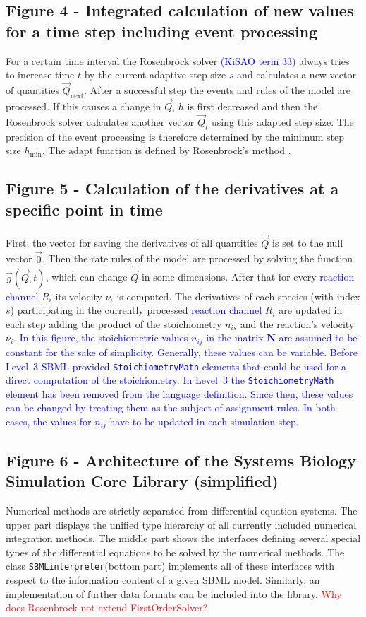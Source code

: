 \documentclass[10pt]{bmc_article}
\newenvironment{bmcformat}{\fussy\setboolean{publ}{true}}{\fussy}
\newcommand{\COR}[1]                      {\textcolor{blue}{#1}}
\newcommand{\SBMLinterpreter}             {\texttt{SBML\-interpreter}\xspace}
\newcommand{\StoichiometryMath}           {\texttt{Stoi\-chio\-metry\-Math}\xspace}
\newcommand{\TODO}[1]                     {\textcolor{red}{#1}}
\begin{document}
\begin{bmcformat}
\subsection*{Figure 4 - Integrated calculation of new values for a time step including event processing}
For a certain time interval the Rosenbrock solver \COR{(\acs{KiSAO} term 33)} always tries to increase time $t$ by the current adaptive
step size $s$ and calculates a new vector of quantities $\vec{Q}_{\mathrm{next}}$.
After a successful step the events and rules of the model are processed.
If this causes a change in $\vec{Q}$, $h$ is first decreased and then the Rosenbrock solver calculates another vector $\vec{Q}_{t}$ using this adapted step size.
The precision of the event processing is therefore determined by the minimum step size $h_{\min}$.
The $\mathrm{adapt}$ function is defined by Rosenbrock's method \cite{Press1993}.

\subsection*{Figure 5 - Calculation of the derivatives at a specific point in time}
First, the vector for saving the derivatives of all quantities $\dot{\vec{Q}}$ is set to the null vector $\vec{0}$.
Then the rate rules of the model are processed by solving the function $\vec{g}(\vec{Q}, t)$, which can change $\dot{\vec{Q}}$ in some dimensions.
After that for every \COR{reaction channel} $R_i$ its velocity $\nu_i$ is computed.
The derivatives of each species (with index $s$) participating in the currently processed \COR{reaction channel} $R_i$ are updated
in each step adding the product of the stoichiometry $n_{is}$ and the reaction's velocity $\nu_i$.
\COR{In this figure, the stoichiometric values $n_{ij}$ in the matrix $\mathbf{N}$ are assumed to be constant for the sake of simplicity.
Generally, these values can be variable.
Before Level~3 \acs{SBML} provided \StoichiometryMath elements that could be used for a direct computation of the stoichiometry.
In Level~3 the \StoichiometryMath element has been removed from the language definition.
Since then, these values can be changed by treating them as the subject of assignment rules.
In both cases, the values for $n_{ij}$ have to be updated in each simulation step.}

\subsection*{Figure 6 - Architecture of the Systems Biology Simulation Core Library (simplified)}
Numerical methods are strictly separated from differential equation systems. The
upper part displays the unified type hierarchy of all currently included numerical integration
methods. The middle part shows the interfaces defining several
special types of the differential equations to be solved by the numerical
methods.
The class \SBMLinterpreter (bottom part) implements all of these interfaces
with respect to the information content of a given \acs{SBML} model. Similarly, an
implementation of further data formats can be included into the
library.
\TODO{Why does Rosenbrock not extend FirstOrderSolver?}


\end{bmcformat}
\end{document}
